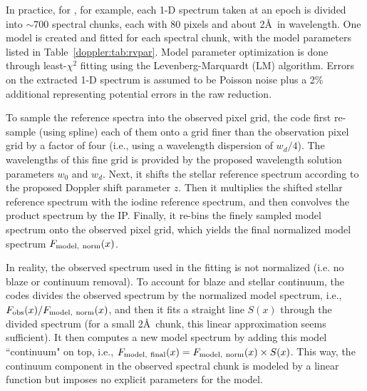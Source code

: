 In practice, for \keck, for example, each 1-D spectrum taken at an
epoch is divided into $\sim$700 spectral chunks, each with 80 pixels
and about 2\AA\ in wavelength. One model is created and fitted for
each spectral chunk, with the model parameters listed in
Table~\ref{doppler:tab:rvpar}. Model parameter optimization is done
through least-$\chi^2$ fitting using the Levenberg-Marquardt (LM)
algorithm. Errors on the extracted 1-D spectrum is assumed to be
Poisson noise plus a 2\% additional representing potential errors in
the raw reduction.

To sample the reference spectra into the observed pixel grid, the code
first re-sample (using spline) each of them onto a grid finer than the
observation pixel grid by a factor of four (i.e., using a wavelength
dispersion of $w_d/4$). The wavelengths of this fine grid is provided
by the proposed wavelength solution parameters $w_0$ and $w_d$. Next,
it shifts the stellar reference spectrum according to the proposed
Doppler shift parameter $z$. Then it multiplies the shifted stellar
reference spectrum with the iodine reference spectrum, and then
convolves the product spectrum by the IP. Finally, it re-bins the
finely sampled model spectrum onto the observed pixel grid, which
yields the final normalized model spectrum $F_{\rm model,\ norm}(x)$.

In reality, the observed spectrum used in the fitting is not
normalized (i.e. no blaze or continuum removal). To account for blaze
and stellar continuum, the codes divides the observed spectrum by the
normalized model spectrum, i.e., $F_{\rm obs}(x)/F_{\rm model,\
  norm}(x)$, and then it fits a straight line $S(x)$ through the
divided spectrum (for a small 2\AA\ chunk, this linear approximation
seems sufficient). It then computes a new model spectrum by adding
this model ``continuum" on top, i.e., $F_{\rm model,\ final}(x) =
F_{\rm model,\ norm}(x) \times S(x)$. This way, the continuum component
in the observed spectral chunk is modeled by a linear function but
imposes no explicit parameters for the model.



